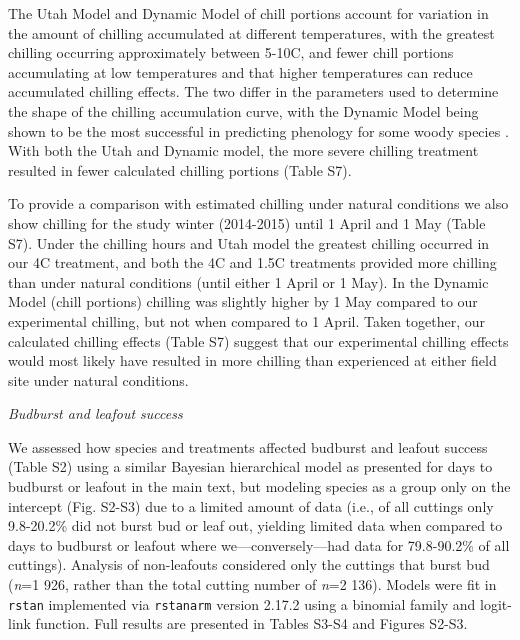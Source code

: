 \documentclass{article}
\begin{document}
\noindent The Utah Model and Dynamic Model of chill portions account for variation in the amount of chilling accumulated at different temperatures, with the greatest chilling occurring approximately between 5-10\degree C, and fewer chill portions accumulating at low temperatures and that higher temperatures can reduce accumulated chilling effects. The two differ in the parameters used to determine the shape of the chilling accumulation curve, with the Dynamic Model being shown to be the most successful in predicting phenology for some woody species \citep{Luedeling:2009}. With both the Utah and Dynamic model, the more severe chilling treatment resulted in fewer calculated chilling portions (Table S7). 

\noindent To provide a comparison with estimated chilling under natural conditions we also show chilling for the study winter (2014-2015) until 1 April and 1 May (Table S7). Under the chilling hours and Utah model the greatest chilling occurred in our 4\degree C treatment, and both the 4\degree C and 1.5\degree C treatments provided more chilling than under natural conditions (until either 1 April or 1 May). In the Dynamic Model (chill portions) chilling was slightly higher by 1 May compared to our experimental chilling, but not when compared to 1 April. Taken together, our calculated chilling effects (Table S7) suggest that our experimental chilling effects would most likely have resulted in more chilling than experienced at either field site under natural conditions. 

\noindent\emph{Budburst and leafout success}

\noindent We assessed how species and treatments affected budburst and leafout success (Table S2) using a similar Bayesian hierarchical model as presented for days to budburst or leafout in the main text, but modeling species as a group only on the intercept (Fig. S2-S3) due to a limited amount of data (i.e., of all cuttings only 9.8-20.2\% did not burst bud or leaf out, yielding limited data when compared to days to budburst or leafout where we---conversely---had data for 79.8-90.2\% of all cuttings). Analysis of non-leafouts considered only the cuttings that burst bud (\emph{n}=1 926, rather than the total cutting number of \emph{n}=2 136). Models were fit in \verb|rstan| implemented via  \verb|rstanarm| version 2.17.2 using a binomial family and logit-link function. Full results are presented in Tables S3-S4 and Figures S2-S3.
\end{document}
